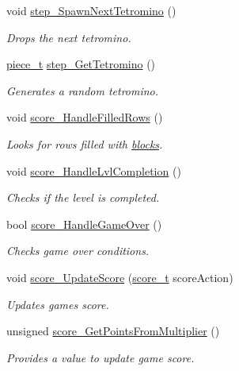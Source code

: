 \begin{DoxyCompactItemize}
void \hyperlink{classTetreesEngine_a446196c2260e2ce2ac0d18848ee6b636}{step\+\_\+\+Spawn\+Next\+Tetromino} ()
\begin{DoxyCompactList}\small\item\em Drops the next tetromino. \end{DoxyCompactList}\item 
\hyperlink{structpiece__t}{piece\+\_\+t} \hyperlink{classTetreesEngine_a94d5fd25eec05994f02bb514496ec66d}{step\+\_\+\+Get\+Tetromino} ()
\begin{DoxyCompactList}\small\item\em Generates a random tetromino. \end{DoxyCompactList}\item 
void \hyperlink{classTetreesEngine_ad379bf5d98a182411d4d91b12b6ef5ba}{score\+\_\+\+Handle\+Filled\+Rows} ()
\begin{DoxyCompactList}\small\item\em Looks for rows filled with \hyperlink{TetreesDefs_8hpp_ad8f0654cf997b7ea7eb14924d0b1ea33}{blocks}. \end{DoxyCompactList}\item 
void \hyperlink{classTetreesEngine_aa7d501cb6f73111321e1dadbc140ebc8}{score\+\_\+\+Handle\+Lvl\+Completion} ()
\begin{DoxyCompactList}\small\item\em Checks if the level is completed. \end{DoxyCompactList}\item 
bool \hyperlink{classTetreesEngine_a31898b1228f8b0381a82871669503b34}{score\+\_\+\+Handle\+Game\+Over} ()
\begin{DoxyCompactList}\small\item\em Checks game over conditions. \end{DoxyCompactList}\item 
void \hyperlink{classTetreesEngine_a856a9de6a79138a19b638d9287d7bc72}{score\+\_\+\+Update\+Score} (\hyperlink{TetreesDefs_8hpp_a5a3b4d94c69ae85b911a8dca1afedfe0}{score\+\_\+t} score\+Action)
\begin{DoxyCompactList}\small\item\em Updates game\textquotesingle{}s score. \end{DoxyCompactList}\item 
unsigned \hyperlink{classTetreesEngine_a848fc0ff4003f3c4d74c11efdc91f0cb}{score\+\_\+\+Get\+Points\+From\+Multiplier} ()
\begin{DoxyCompactList}\small\item\em Provides a value to update game score. \end{DoxyCompactList}\end{DoxyCompactItemize}
